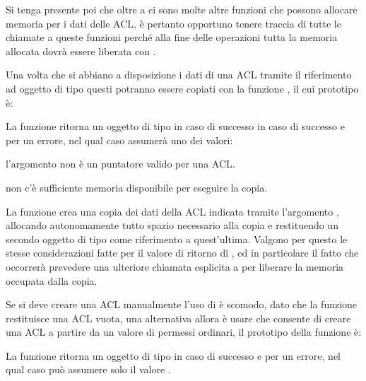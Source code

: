 Si tenga presente poi che oltre a  ci sono molte altre
funzioni che possono allocare memoria per i dati delle ACL, è pertanto
opportuno tenere traccia di tutte le chiamate a queste funzioni perché alla
fine delle operazioni tutta la memoria allocata dovrà essere liberata con
.

Una volta che si abbiano a disposizione i dati di una ACL tramite il
riferimento ad oggetto di tipo  questi potranno essere copiati
con la funzione , il cui prototipo è:

\begin{funcproto}{
}

{La funzione ritorna un oggetto di tipo  in caso di successo in
  caso di successo e  per un errore, nel qual caso 
  assumerà uno dei valori:
  \begin{errlist}
  \item[\errcode{EINVAL}] l'argomento  non è un puntatore valido
    per una ACL.
  \item[\errcode{ENOMEM}] non c'è sufficiente memoria disponibile per eseguire
    la copia.
  \end{errlist}
}
\end{funcproto}

La funzione crea una copia dei dati della ACL indicata tramite l'argomento
, allocando autonomamente tutto spazio necessario alla copia e
restituendo un secondo oggetto di tipo  come riferimento a
quest'ultima.  Valgono per questo le stesse considerazioni fatte per il valore
di ritorno di , ed in particolare il fatto che occorrerà
prevedere una ulteriore chiamata esplicita a  per liberare la
memoria occupata dalla copia.

Se si deve creare una ACL manualmente l'uso di  è scomodo,
dato che la funzione restituisce una ACL vuota, una alternativa allora è usare
 che consente di creare una ACL a partire da un valore
di permessi ordinari, il prototipo della funzione è:

\begin{funcproto}{
}

{La funzione ritorna un oggetto di tipo  in caso di successo e
   per un errore, nel qual caso  può assumere solo
  il valore .}
\end{funcproto}


